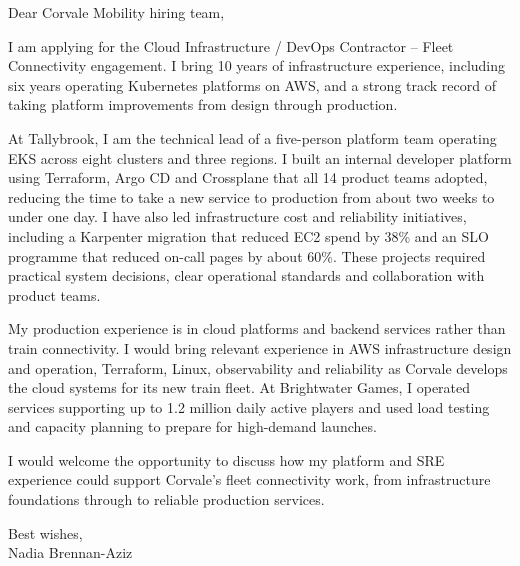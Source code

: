 \documentclass[11pt,a4paper]{article}
\begin{document}
Dear Corvale Mobility hiring team,

I am applying for the Cloud Infrastructure / DevOps Contractor -- Fleet Connectivity engagement. I bring 10 years of infrastructure experience, including six years operating Kubernetes platforms on AWS, and a strong track record of taking platform improvements from design through production.

At Tallybrook, I am the technical lead of a five-person platform team operating EKS across eight clusters and three regions. I built an internal developer platform using Terraform, Argo CD and Crossplane that all 14 product teams adopted, reducing the time to take a new service to production from about two weeks to under one day. I have also led infrastructure cost and reliability initiatives, including a Karpenter migration that reduced EC2 spend by 38\% and an SLO programme that reduced on-call pages by about 60\%. These projects required practical system decisions, clear operational standards and collaboration with product teams.

My production experience is in cloud platforms and backend services rather than train connectivity. I would bring relevant experience in AWS infrastructure design and operation, Terraform, Linux, observability and reliability as Corvale develops the cloud systems for its new train fleet. At Brightwater Games, I operated services supporting up to 1.2 million daily active players and used load testing and capacity planning to prepare for high-demand launches.

I would welcome the opportunity to discuss how my platform and SRE experience could support Corvale’s fleet connectivity work, from infrastructure foundations through to reliable production services.

Best wishes,\\
\textcolor{sectioncolor}{Nadia Brennan-Aziz}
\end{document}
